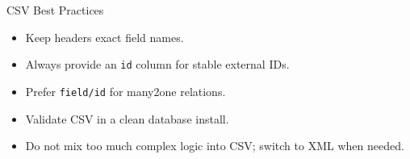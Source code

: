 \begin{frame}{CSV Best Practices}
	\begin{itemize}
		\item Keep headers exact field names.
		\item Always provide an \texttt{id} column for stable external IDs.
		\item Prefer \texttt{field/id} for many2one relations.
		\item Validate CSV in a clean database install.
		\item Do not mix too much complex logic into CSV; switch to XML when needed.
	\end{itemize}
\end{frame}
